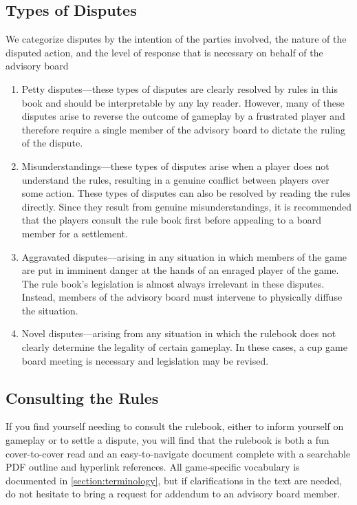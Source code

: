 \documentclass[12pt]{IEEEtran}
\begin{document}
\subsection{Types of Disputes}
We categorize disputes by the intention of the parties involved, the nature of the disputed action, and the level of response that is necessary on behalf of the advisory board
\begin{enumerate}
    \item Petty disputes---these types of disputes are clearly resolved by rules in this book and should be interpretable by any lay reader. However, many of these disputes arise to reverse the outcome of gameplay by a frustrated player and therefore require a single member of the advisory board to dictate the ruling of the dispute.
    \item Misunderstandings---these types of disputes arise when a player does not understand the rules, resulting in a genuine conflict between players over some action. These types of disputes can also be resolved by reading the rules directly. Since they result from genuine misunderstandings, it is recommended that the players consult the rule book first before appealing to a board member for a settlement.
    \item Aggravated disputes---arising in any situation in which members of the game are put in imminent danger at the hands of an enraged player of the game. The rule book's legislation is almost always irrelevant in these disputes. Instead, members of the advisory board must intervene to physically diffuse the situation.
    \item Novel disputes---arising from any situation in which the rulebook does not clearly determine the legality of certain gameplay. In these cases, a cup game board meeting is necessary and legislation may be revised.
\end{enumerate}
\subsection{Consulting the Rules}
If you find yourself needing to consult the rulebook, either to inform yourself on gameplay or to settle a dispute, you will find that the rulebook is both a fun cover-to-cover read and an easy-to-navigate document complete with a searchable PDF outline and hyperlink references. All game-specific vocabulary is documented in \ref{section:terminology}, but if clarifications in the text are needed, do not hesitate to bring a request for addendum to an advisory board member.
\end{document}
